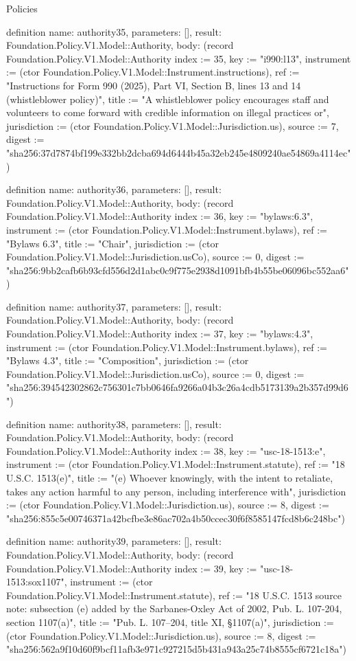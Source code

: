 \begin{lexlean}{Policies}
\begin{semanticmodule}
definition{
  name: authority35,
  parameters: [],
  result: Foundation.Policy.V1.Model::Authority,
  body: (record Foundation.Policy.V1.Model::Authority {index := 35, key := "i990:l13", instrument := (ctor Foundation.Policy.V1.Model::Instrument.instructions), ref := "Instructions for Form 990 (2025), Part VI, Section B, lines 13 and 14 (whistleblower policy)", title := "A whistleblower policy encourages staff and volunteers to come forward with credible information on illegal practices or", jurisdiction := (ctor Foundation.Policy.V1.Model::Jurisdiction.us), source := 7, digest := "sha256:37d7874bf199e332bb2dcba694d6444b45a32eb245e4809240ae54869a4114ec"})
}

definition{
  name: authority36,
  parameters: [],
  result: Foundation.Policy.V1.Model::Authority,
  body: (record Foundation.Policy.V1.Model::Authority {index := 36, key := "bylaws:6.3", instrument := (ctor Foundation.Policy.V1.Model::Instrument.bylaws), ref := "Bylaws 6.3", title := "Chair", jurisdiction := (ctor Foundation.Policy.V1.Model::Jurisdiction.usCo), source := 0, digest := "sha256:9bb2cafb6b93cfd556d2d1abc0c9f775e2938d1091bfb4b55be06096bc552aa6"})
}

definition{
  name: authority37,
  parameters: [],
  result: Foundation.Policy.V1.Model::Authority,
  body: (record Foundation.Policy.V1.Model::Authority {index := 37, key := "bylaws:4.3", instrument := (ctor Foundation.Policy.V1.Model::Instrument.bylaws), ref := "Bylaws 4.3", title := "Composition", jurisdiction := (ctor Foundation.Policy.V1.Model::Jurisdiction.usCo), source := 0, digest := "sha256:394542302862c756301c7bb0646fa9266a04b3c26a4cdb5173139a2b357d99d6"})
}

definition{
  name: authority38,
  parameters: [],
  result: Foundation.Policy.V1.Model::Authority,
  body: (record Foundation.Policy.V1.Model::Authority {index := 38, key := "usc-18-1513:e", instrument := (ctor Foundation.Policy.V1.Model::Instrument.statute), ref := "18 U.S.C. 1513(e)", title := "(e) Whoever knowingly, with the intent to retaliate, takes any action harmful to any person, including interference with", jurisdiction := (ctor Foundation.Policy.V1.Model::Jurisdiction.us), source := 8, digest := "sha256:855c5e00746371a42bcfbe3e86ac702a4b50ccec30f6f8585147fcd8b6c248bc"})
}

definition{
  name: authority39,
  parameters: [],
  result: Foundation.Policy.V1.Model::Authority,
  body: (record Foundation.Policy.V1.Model::Authority {index := 39, key := "usc-18-1513:sox1107", instrument := (ctor Foundation.Policy.V1.Model::Instrument.statute), ref := "18 U.S.C. 1513 source note: subsection (e) added by the Sarbanes-Oxley Act of 2002, Pub. L. 107-204, section 1107(a)", title := "Pub. L. 107–204, title XI, §1107(a)", jurisdiction := (ctor Foundation.Policy.V1.Model::Jurisdiction.us), source := 8, digest := "sha256:562a9f10d60f9bcf11afb3e971c927215d5b431a943a25c74b8555cf6721c18a"})
}


\end{semanticmodule}
\end{lexlean}
